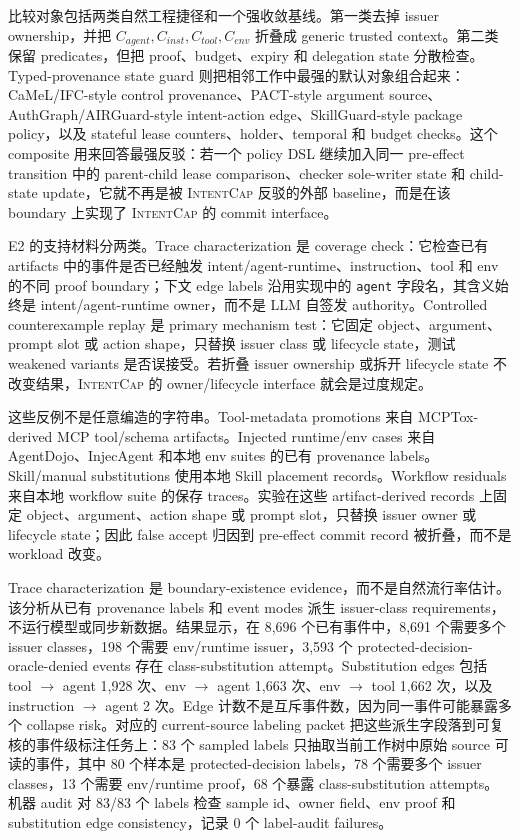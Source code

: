 \documentclass[UTF8,a4paper,11pt]{ctexart}
\newcommand{\sys}{\textsc{IntentCap}\xspace}
\begin{document}
比较对象包括两类自然工程捷径和一个强收敛基线。第一类去掉 issuer ownership，并把 \(C_{agent},C_{inst},C_{tool},C_{env}\) 折叠成 generic trusted context。第二类保留 predicates，但把 proof、budget、expiry 和 delegation state 分散检查。Typed-provenance state guard 则把相邻工作中最强的默认对象组合起来：CaMeL/IFC-style control provenance、PACT-style argument source、AuthGraph/AIRGuard-style intent-action edge、SkillGuard-style package policy，以及 stateful lease counters、holder、temporal 和 budget checks。这个 composite 用来回答最强反驳：若一个 policy DSL 继续加入同一 pre-effect transition 中的 parent-child lease comparison、checker sole-writer state 和 child-state update，它就不再是被 \sys 反驳的外部 baseline，而是在该 boundary 上实现了 \sys 的 commit interface。

E2 的支持材料分两类。Trace characterization 是 coverage check：它检查已有 artifacts 中的事件是否已经触发 intent/agent-runtime、instruction、tool 和 env 的不同 proof boundary；下文 edge labels 沿用实现中的 \texttt{agent} 字段名，其含义始终是 intent/agent-runtime owner，而不是 LLM 自签发 authority。Controlled counterexample replay 是 primary mechanism test：它固定 object、argument、prompt slot 或 action shape，只替换 issuer class 或 lifecycle state，测试 weakened variants 是否误接受。若折叠 issuer ownership 或拆开 lifecycle state 不改变结果，\sys 的 owner/lifecycle interface 就会是过度规定。

这些反例不是任意编造的字符串。Tool-metadata promotions 来自 MCPTox-derived MCP tool/schema artifacts。Injected runtime/env cases 来自 AgentDojo、InjecAgent 和本地 env suites 的已有 provenance labels。Skill/manual substitutions 使用本地 Skill placement records。Workflow residuals 来自本地 workflow suite 的保存 traces。实验在这些 artifact-derived records 上固定 object、argument、action shape 或 prompt slot，只替换 issuer owner 或 lifecycle state；因此 false accept 归因到 pre-effect commit record 被折叠，而不是 workload 改变。

Trace characterization 是 boundary-existence evidence，而不是自然流行率估计。该分析从已有 provenance labels 和 event modes 派生 issuer-class requirements，不运行模型或同步新数据。结果显示，在 8,696 个已有事件中，8,691 个需要多个 issuer classes，198 个需要 env/runtime issuer，3,593 个 protected-decision-oracle-denied events 存在 class-substitution attempt。Substitution edges 包括 tool \(\rightarrow\) agent 1,928 次、env \(\rightarrow\) agent 1,663 次、env \(\rightarrow\) tool 1,662 次，以及 instruction \(\rightarrow\) agent 2 次。Edge 计数不是互斥事件数，因为同一事件可能暴露多个 collapse risk。对应的 current-source labeling packet 把这些派生字段落到可复核的事件级标注任务上：83 个 sampled labels 只抽取当前工作树中原始 source 可读的事件，其中 80 个样本是 protected-decision labels，78 个需要多个 issuer classes，13 个需要 env/runtime proof，68 个暴露 class-substitution attempts。机器 audit 对 83/83 个 labels 检查 sample id、owner field、env proof 和 substitution edge consistency，记录 0 个 label-audit failures。
\end{document}
